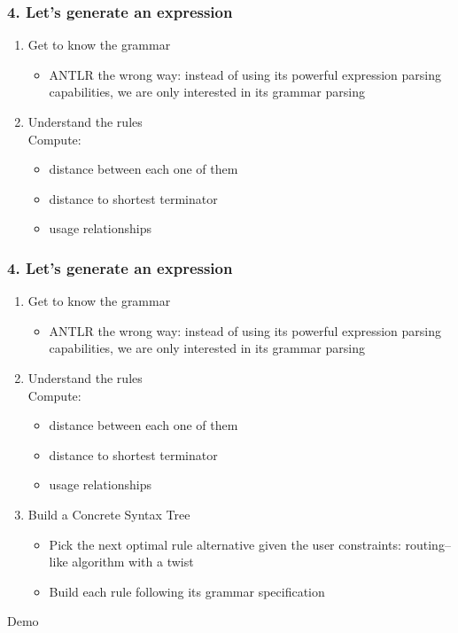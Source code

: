 \documentclass[t,aspectratio=32]{beamer}
\begin{document}
\begin{frame}
\frametitle{4. Let's generate an expression}

\begin{enumerate}
\item Get to know the grammar
    \begin{itemize}
    \item ANTLR the wrong way: instead of using its powerful expression parsing
          capabilities, we are only interested in its grammar parsing
    \end{itemize}
\item Understand the rules\\
    Compute:
    \begin{itemize}
    \item distance between each one of them
    \item distance to shortest terminator
    \item usage relationships
    \end{itemize}
\end{enumerate}
\end{frame}

\begin{frame}
\frametitle{4. Let's generate an expression}

\begin{enumerate}
\item Get to know the grammar
    \begin{itemize}
    \item ANTLR the wrong way: instead of using its powerful expression parsing
          capabilities, we are only interested in its grammar parsing
    \end{itemize}
\item Understand the rules\\
    Compute:
    \begin{itemize}
    \item distance between each one of them
    \item distance to shortest terminator
    \item usage relationships
    \end{itemize}
\item Build a Concrete Syntax Tree
    \begin{itemize}
    \item Pick the next optimal rule alternative given the user constraints:
          routing–like algorithm with a twist
    \item Build each rule following its grammar specification
    \end{itemize}
\end{enumerate}
\end{frame}


\begin{frame}[c]
\centering
\Huge Demo
\end{frame}
\end{document}
